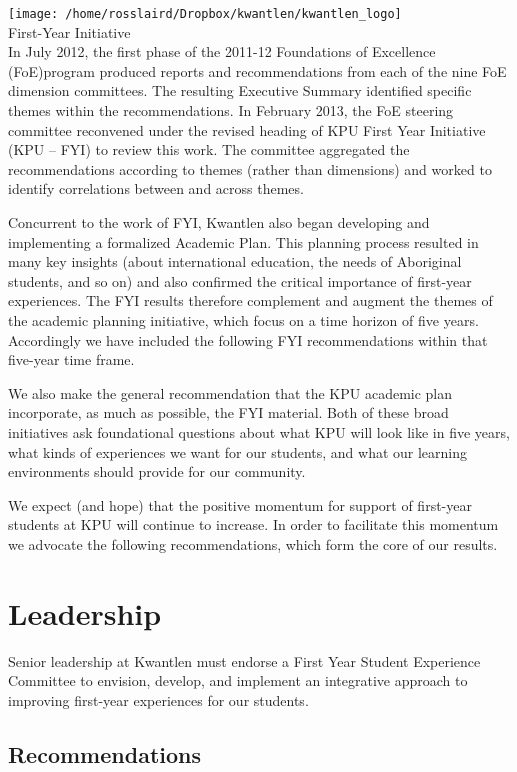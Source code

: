 \documentclass[11pt, letterpaper]{article}
\begin{document}
    \thispagestyle{empty}
    \reversemarginpar
    \noindent
    \texttt{[image: /home/rosslaird/Dropbox/kwantlen/kwantlen\_logo]}\\[1em]
    {\LARGE First-Year Initiative}\\[2em]

In July 2012, the first phase of the 2011-12 Foundations of Excellence
(FoE)program produced reports and recommendations from each of the nine
FoE dimension committees. The resulting Executive Summary identified
specific themes within the recommendations. In February 2013, the FoE
steering committee reconvened under the revised heading of KPU First
Year Initiative (KPU -- FYI) to review this work. The committee
aggregated the recommendations according to themes (rather than
dimensions) and worked to identify correlations between and across themes.

Concurrent to the work of FYI, Kwantlen also began developing and implementing a formalized Academic Plan. This planning process resulted in many key insights (about international education, the needs of Aboriginal students, and so on) and also confirmed the critical importance of first-year experiences. The FYI results therefore complement and augment the themes of the academic planning initiative, which focus on a time horizon of five years. Accordingly we have included the following FYI recommendations within that five-year time frame.

We also make the general recommendation that the KPU academic plan incorporate, as much as possible, the FYI material. Both of these broad initiatives ask foundational questions about what KPU will look like in five years, what kinds of experiences we want for our students, and what our learning environments should provide for our community.

We expect (and hope) that the positive momentum for support of first-year students at KPU will continue to increase. In order to facilitate this momentum we advocate the following recommendations, which form the core of our results.
\newpage
\section{Leadership}

Senior leadership at Kwantlen must endorse a First Year Student
Experience Committee to envision, develop, and implement an integrative
approach to improving first-year experiences for our students.

\subsection{Recommendations}
\end{document}
